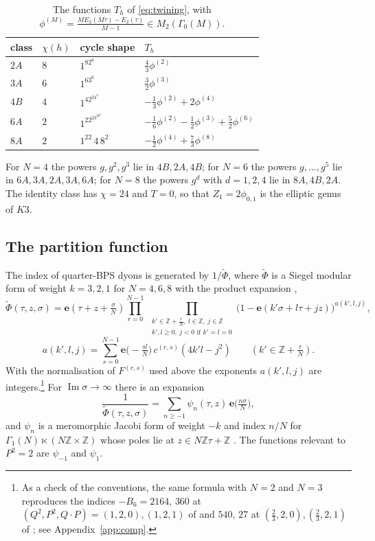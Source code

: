 \documentclass[11pt]{amsart}
\theoremstyle{definition}
\newcommand{\ZZ}{\mathbb{Z}}
\newcommand{\e}{\mathbf{e}}
\newcommand{\Phit}{\widetilde{\Phi}}
\begin{document}
\begin{table}[t]
\centering
\caption{The functions $T_h$ of \eqref{eq:twining}, with $\phi^{(M)}=\frac{ME_2(M\tau)-E_2(\tau)}{M-1}\in M_2(\Gamma_0(M))$.}\label{tab:twining}
\begin{tabular}{llll}
\toprule
class & $\chi(h)$ & cycle shape & $T_h$\\
\midrule
$2A$ & $8$ & $1^82^8$ & $\frac43\phi^{(2)}$\\
$3A$ & $6$ & $1^63^6$ & $\frac32\phi^{(3)}$\\
$4B$ & $4$ & $1^42^24^4$ & $-\frac13\phi^{(2)}+2\phi^{(4)}$\\
$6A$ & $2$ & $1^22^23^26^2$ & $-\frac16\phi^{(2)}-\frac12\phi^{(3)}+\frac52\phi^{(6)}$\\
$8A$ & $2$ & $1^22\,4\,8^2$ & $-\frac12\phi^{(4)}+\frac73\phi^{(8)}$\\
\bottomrule
\end{tabular}
\end{table}

For $N=4$ the powers $g,g^2,g^3$ lie in $4B,2A,4B$; for $N=6$ the powers $g,\dots,g^5$ lie in $6A,3A,2A,3A,6A$; for $N=8$ the powers $g^d$ with $d=1,2,4$ lie in $8A,4B,2A$. The identity class has $\chi=24$ and $T=0$, so that $Z_1=2\phi_{0,1}$ is the elliptic genus of $K3$.

\subsection{The partition function}
The index of quarter-BPS dyons is generated by $1/\Phit$, where $\Phit$ is a Siegel modular form of weight $k=3,2,1$ for $N=4,6,8$ with the product expansion \cite{DJS06}, \cite[(5.2)]{BSS25}
\begin{equation}\label{eq:product}
\Phit(\tau,z,\sigma)=\e(\tau+z+\tfrac\sigma N)\prod_{r=0}^{N-1}\ \prod_{\substack{k'\in\ZZ+\frac rN,\ l\in\ZZ,\ j\in\ZZ\\ k',l\ge0,\ j<0\text{ if }k'=l=0}}\bigl(1-\e(k'\sigma+l\tau+jz)\bigr)^{a(k',l,j)},
\end{equation}
\[
a(k',l,j)=\sum_{s=0}^{N-1}\e\bigl(-\tfrac{sl}N\bigr)\,c^{(r,s)}(4k'l-j^2)\qquad(k'\in\ZZ+\tfrac rN).
\]
With the normalisation of $F^{(r,s)}$ used above the exponents $a(k',l,j)$ are integers.\footnote{As a check of the conventions, the same formula with $N=2$ and $N=3$ reproduces the indices $-B_6=2164$, $360$ at $(Q^2,P^2,Q\cdot P)=(1,2,0),(1,2,1)$ of \cite[Table~2]{Sen11} and $540$, $27$ at $(\frac23,2,0),(\frac23,2,1)$ of \cite[Table~3]{Sen11}; see Appendix~\ref{app:comp}.} For $\operatorname{Im}\sigma\to\infty$ there is an expansion \cite[Proposition~5.1]{BSS25}
\[
\frac1{\Phit(\tau,z,\sigma)}=\sum_{n\ge-1}\psi_n(\tau,z)\,\e\bigl(\tfrac{n\sigma}N\bigr),
\]
and $\psi_n$ is a meromorphic Jacobi form of weight $-k$ and index $n/N$ for $\Gamma_1(N)\ltimes(N\ZZ\times\ZZ)$ whose poles lie at $z\in N\ZZ\tau+\ZZ$ \cite[(5.39)]{BSS25}. The functions relevant to $P^2=2$ are $\psi_{-1}$ and $\psi_1$.
\end{document}
